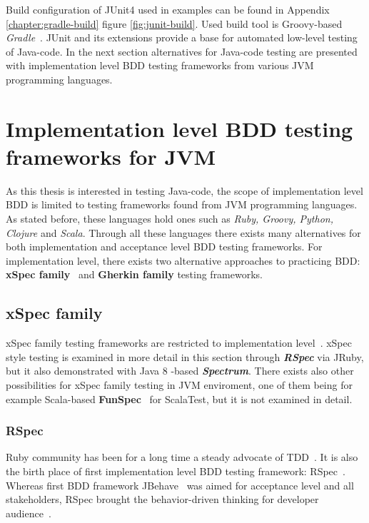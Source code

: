     Build configuration of JUnit4 used in examples can be found in Appendix \ref{chapter:gradle-build} figure \ref{fig:junit-build}.
    Used build tool is Groovy-based \textit{Gradle}~\cite{gradle}.
    JUnit and its extensions provide a base for automated low-level testing of Java-code.
    In the next section alternatives for Java-code testing are presented with implementation level BDD testing frameworks from
    various JVM programming languages.

\section{Implementation level BDD testing frameworks for JVM}
    As this thesis is interested in testing Java-code, the scope of implementation level BDD is limited to testing frameworks
    found from JVM programming languages. As stated before, these languages hold ones such as \textit{Ruby, Groovy, Python,
    Clojure} and \textit{Scala}. Through all these languages there exists many alternatives for both implementation and
    acceptance level BDD testing frameworks. For implementation level, there exists two alternative approaches to practicing
    BDD: \textbf{xSpec family}~\cite{solis2011study} and \textbf{Gherkin family} testing frameworks.

    \subsection{xSpec family}
    xSpec family testing frameworks are restricted to implementation level~\cite{solis2011study}. xSpec style testing
    is examined in more detail in this section through \textbf{\textit{RSpec}} via JRuby, but it also demonstrated with
    Java 8 -based \textbf{\textit{Spectrum}}. There exists also other possibilities for xSpec family testing in JVM enviroment,
    one of them being for example Scala-based \textbf{FunSpec}~\cite{funspec} for ScalaTest, but it is not examined in detail.

    \subsubsection{RSpec}
    Ruby community has been for a long time a steady advocate of TDD~\cite{lerner2009forge}. It is also the birth place
    of first implementation level BDD testing framework: RSpec~\cite{astels2006new}. Whereas first BDD framework
    JBehave~\cite{bdd2006north} was aimed for acceptance level and all stakeholders, RSpec brought the behavior-driven thinking for developer
    audience~\cite{astels2006new}.

